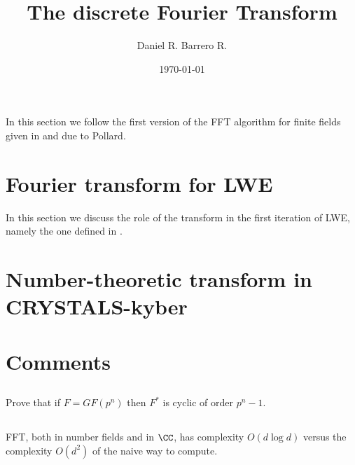 \documentclass{amsart}
\title{The discrete Fourier Transform}
\author{Daniel R. Barrero R.}
\date{\today}
\begin{document}
\maketitle

\section{}

In this section we follow the first version of the FFT algorithm for finite
fields given in \cite{pollard-fftFiniteFields-1971} and due to Pollard.

%

\section{Fourier transform for LWE}

In this section we discuss the role of the transform in the first iteration of LWE, namely the one defined in \cite{regev-LWE-2009}.

\section{Number-theoretic transform in CRYSTALS-kyber}



\section{Comments}

\subsection{} Prove that if $F = GF(p^n)$ then $F^*$ is cyclic of order
$p^n - 1$.

\subsection{} FFT, both in number fields and in $\CC$, has complexity
$O(d \log d)$ versus the complexity $O(d^2)$ of the naive way to compute.



%
\end{document}
